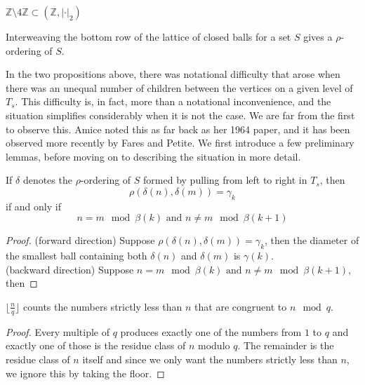 \begin{proposition*}
\begin{example}
\end{example}

\begin{example}
$\mathbb{Z} \setminus 4\mathbb{Z} \subset (\mathbb{Z}, \lvert \cdot \rvert_2)$
\end{example}


\begin{corollary*}
Interweaving the bottom row of the lattice of closed balls for a set $S$ gives a $\rho$-ordering of $S$. 
\end{corollary*}

In the two propositions above, there was notational difficulty that arose when there was an unequal number of children between the vertices on a given level of $T_s$. This difficulty is, in fact, more than a notational inconvenience, and the situation simplifies considerably when it is not the case. We are far from the first to observe this. Amice noted this as far back as her 1964 paper, and it has been observed more recently by Fares and Petite. We first introduce a few preliminary lemmas, before moving on to describing the situation in more detail.

\begin{lemma*}
If $\delta$ denotes the $\rho$-ordering of $S$ formed by pulling from left to right in $T_s$, then \[\rho(\delta(n),\delta(m))=\gamma_k\] if and only if \[ n=m \mod \beta(k) \text{  and } n \neq m \mod \beta(k+1)\]
\end{lemma*}

\begin{proof}
(forward direction) Suppose $\rho(\delta(n),\delta(m))=\gamma_k$, then the diameter of the smallest ball containing both $\delta(n)$ and $\delta(m)$ is $\gamma(k)$. \\

(backward direction) Suppose $n=m \mod \beta(k) \text{  and } n \neq m \mod \beta(k+1)$, then 
\end{proof}

\begin{lemma*}
$\lfloor\frac{n}{q} \rfloor$ counts the numbers strictly less than $n$ that are congruent to $n \mod q$.
\end{lemma*}

\begin{proof}
Every multiple of $q$ produces exactly one of the numbers from $1$ to $q$ and exactly one of those is the residue class of $n$ modulo $q$. The remainder is the residue class of $n$ itself and since we only want the numbers strictly less than $n$, we ignore this by taking the floor.
\end{proof}



\end{proposition*}
